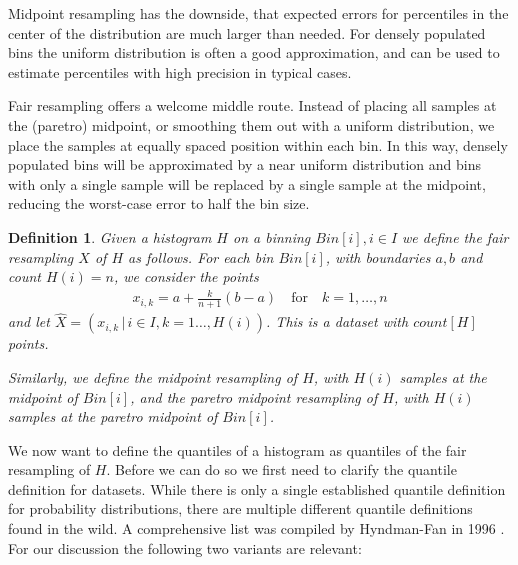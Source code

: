 \documentclass{article}
\theoremstyle{plain}
\newtheorem{definition}{Definition}[section]
\theoremstyle{remark}
\newcommand{\qtext}[1]{\quad\text{#1}\quad} %
\begin{document}
Midpoint resampling has the downside, that expected errors for percentiles in the center of the
distribution are much larger than needed. For densely populated bins the uniform distribution is
often a good approximation, and can be used to estimate percentiles with high precision in typical
cases.

Fair resampling offers a welcome middle route. Instead of placing all samples at the (paretro)
midpoint, or smoothing them out with a uniform distribution, we place the samples at equally
spaced position within each bin. In this way, densely populated bins will be approximated by a near
uniform distribution and bins with only a single sample will be replaced by a single sample at the
midpoint, reducing the worst-case error to half the bin size.

\begin{definition}
  Given a histogram $H$ on a binning $Bin[i], i \in I$ we define the fair resampling $X$ of $H$ as follows.
  For each bin $Bin[i]$, with boundaries $a,b$ and count $H(i)=n$, we consider the points
  \begin{align*}
    x_{i,k} = a + \frac{k}{n+1} (b-a) \qtext{for} k=1,\dots,n
  \end{align*}
  and let $\hat{X} = (x_{i,k} \,|\, i \in I, k = 1\dots,H(i))$. This is a dataset with $count[H]$ points.

  Similarly, we define the midpoint resampling of $H$, with $H(i)$ samples at the midpoint of $Bin[i]$,
  and the paretro midpoint resampling of $H$, with $H(i)$ samples at the paretro midpoint of $Bin[i]$.
\end{definition}

We now want to define the quantiles of a histogram as quantiles of the fair resampling of $H$.
Before we can do so we first need to clarify the quantile definition for datasets.
While there is only a single established quantile definition for probability distributions,
there are multiple different quantile definitions found in the wild.
A comprehensive list was compiled by Hyndman-Fan in 1996 \cite{HF1996}.
For our discussion the following two variants are relevant:
\end{document}
